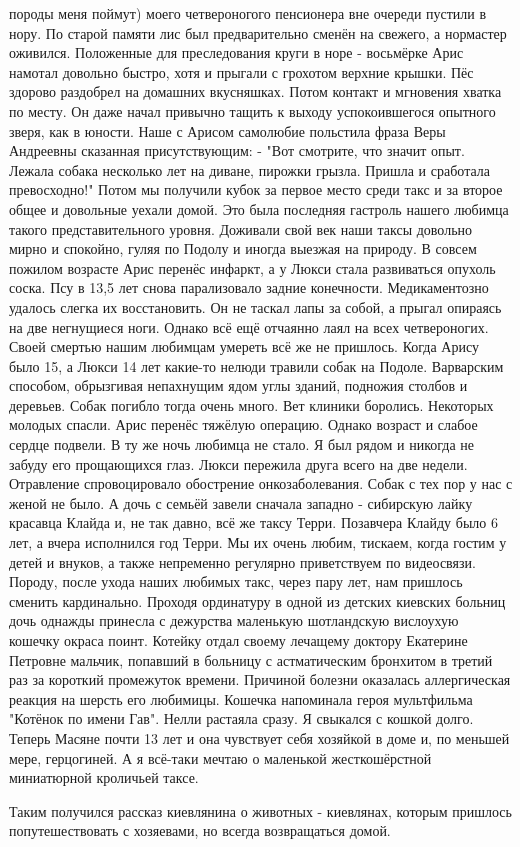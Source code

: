 породы меня поймут) моего четвероногого пенсионера вне очереди пустили в нору.
По старой памяти лис был предварительно сменён на свежего, а нормастер
оживился. Положенные для преследования круги в норе - восьмёрке Арис намотал
довольно быстро, хотя и прыгали с грохотом верхние крышки. Пёс здорово
раздобрел на домашних вкусняшках. Потом контакт и мгновения хватка по месту. Он
даже начал привычно тащить к выходу успокоившегося опытного зверя, как в
юности. Наше с Арисом самолюбие польстила фраза Веры Андреевны сказанная
присутствующим: - "Вот смотрите, что значит опыт. Лежала собака несколько лет
на диване, пирожки грызла. Пришла и сработала превосходно!" Потом мы получили
кубок за первое место среди такс и за второе общее и довольные уехали домой.
Это была последняя гастроль нашего любимца такого представительного уровня.
Доживали свой век наши таксы довольно мирно и спокойно, гуляя по Подолу и
иногда выезжая на природу. В совсем пожилом возрасте Арис перенёс инфаркт, а у
Люкси стала развиваться опухоль соска. Псу в 13,5 лет снова парализовало задние
конечности. Медикаментозно удалось слегка их восстановить. Он не таскал лапы за
собой, а прыгал опираясь на две негнущиеся ноги. Однако всё ещё отчаянно лаял
на всех четвероногих. Своей смертью нашим любимцам умереть всё же не пришлось.
Когда Арису было 15, а Люкси 14 лет какие-то нелюди травили собак на Подоле.
Варварским способом, обрызгивая непахнущим ядом углы зданий, подножия столбов и
деревьев. Собак погибло тогда очень много. Вет клиники боролись. Некоторых
молодых спасли. Арис перенёс тяжёлую операцию. Однако возраст и слабое сердце
подвели. В ту же ночь любимца не стало. Я был рядом и никогда не забуду его
прощающихся глаз. Люкси пережила друга всего на две недели. Отравление
спровоцировало обострение онкозаболевания. Собак с тех пор у нас с женой не
было. А дочь с семьёй завели сначала западно - сибирскую лайку красавца Клайда
и, не так давно, всё же таксу Терри. Позавчера Клайду было 6 лет, а вчера
исполнился год Терри. Мы их очень любим, тискаем, когда гостим у детей и
внуков, а также   непременно регулярно приветствуем по видеосвязи. Породу,
после ухода наших любимых такс, через пару лет, нам пришлось сменить
кардинально. Проходя ординатуру в одной из детских киевских больниц дочь
однажды принесла с дежурства маленькую шотландскую вислоухую кошечку окраса
поинт. Котейку отдал своему лечащему доктору Екатерине Петровне мальчик,
попавший в больницу с астматическим бронхитом в третий раз за короткий
промежуток времени. Причиной болезни оказалась аллергическая реакция на шерсть
его любимицы. Кошечка напоминала героя мультфильма "Котёнок по имени Гав".
Нелли растаяла сразу. Я свыкался с кошкой долго. Теперь Масяне почти 13 лет и
она чувствует себя хозяйкой в доме и, по меньшей мере, герцогиней. А я всё-таки
мечтаю о маленькой жесткошёрстной миниатюрной кроличьей таксе. 

Таким получился рассказ киевлянина о животных - киевлянах, которым пришлось
попутешествовать с хозяевами, но всегда возвращаться домой.
